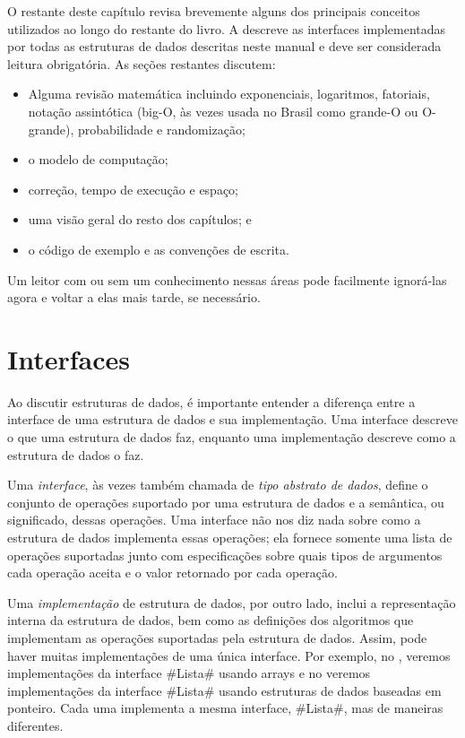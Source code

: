 O restante deste capítulo revisa brevemente alguns dos principais conceitos
utilizados ao longo do restante do livro. A  descreve as
interfaces implementadas por todas as estruturas de dados descritas neste manual
e deve ser considerada leitura obrigatória. As seções restantes discutem:
\begin{itemize}
	\item Alguma revisão matemática incluindo exponenciais, logaritmos, fatoriais,
	notação assintótica (big-O, às vezes usada no Brasil como grande-O ou O-grande), probabilidade e randomização;
	\item o modelo de computação; 
	\item correção, tempo de execução e espaço;
	\item uma visão geral do resto dos capítulos; e 
	\item o código de exemplo e as convenções de escrita.
\end{itemize}
Um leitor com ou sem um conhecimento nessas áreas pode facilmente ignorá-las
agora e voltar a elas mais tarde, se necessário.

\section{Interfaces}
Ao discutir estruturas de dados, é importante entender a diferença entre a
interface de uma estrutura de dados e sua implementação. Uma interface descreve
o que uma estrutura de dados faz, enquanto uma implementação descreve como a
estrutura de dados o faz.

Uma \emph{interface},
%
%
às vezes também chamada de \emph{tipo abstrato de dados}, define o conjunto de
operações suportado por uma estrutura de dados e a semântica, ou significado,
dessas operações. Uma interface não nos diz nada sobre como a estrutura de dados
implementa essas operações; ela fornece somente uma lista de operações
suportadas junto com especificações sobre quais tipos de argumentos cada
operação aceita e o valor retornado por cada operação.

Uma \emph{implementação} de estrutura de dados, por outro lado, inclui 
a representação interna da estrutura de dados, bem como as definições 
dos algoritmos que implementam as operações suportadas pela estrutura de dados. 
Assim, pode haver muitas implementações de uma única interface. 
Por exemplo, no , veremos implementações da interface #Lista#
usando arrays e 
no  veremos implementações da interface #Lista# usando
estruturas de 
dados baseadas em ponteiro. Cada uma implementa a mesma interface, #Lista#, mas
de maneiras diferentes.

